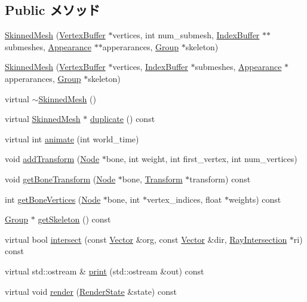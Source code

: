 \subsection*{Public メソッド}
\begin{CompactItemize}
\item 
\hyperlink{classm3g_1_1SkinnedMesh_277419d6851b0e305f66a46095269915}{SkinnedMesh} (\hyperlink{classm3g_1_1VertexBuffer}{VertexBuffer} $\ast$vertices, int num\_\-submesh, \hyperlink{classm3g_1_1IndexBuffer}{IndexBuffer} $\ast$$\ast$submeshes, \hyperlink{classm3g_1_1Appearance}{Appearance} $\ast$$\ast$apperarances, \hyperlink{classm3g_1_1Group}{Group} $\ast$skeleton)
\item 
\hyperlink{classm3g_1_1SkinnedMesh_094bf88089897beeb8b8776e3bbb299d}{SkinnedMesh} (\hyperlink{classm3g_1_1VertexBuffer}{VertexBuffer} $\ast$vertices, \hyperlink{classm3g_1_1IndexBuffer}{IndexBuffer} $\ast$submeshes, \hyperlink{classm3g_1_1Appearance}{Appearance} $\ast$apperarances, \hyperlink{classm3g_1_1Group}{Group} $\ast$skeleton)
\item 
virtual \hyperlink{classm3g_1_1SkinnedMesh_c73da5b5c5f8f14fc241328b4b78928c}{$\sim$SkinnedMesh} ()
\item 
virtual \hyperlink{classm3g_1_1SkinnedMesh}{SkinnedMesh} $\ast$ \hyperlink{classm3g_1_1SkinnedMesh_d3f422cf7656b73687d789094c7eae42}{duplicate} () const 
\item 
virtual int \hyperlink{classm3g_1_1SkinnedMesh_8aad1ceab4c2a03609c8a42324ce484d}{animate} (int world\_\-time)
\item 
void \hyperlink{classm3g_1_1SkinnedMesh_05077c4ee16f87ed4163f4d7a5f4f735}{addTransform} (\hyperlink{classm3g_1_1Node}{Node} $\ast$bone, int weight, int first\_\-vertex, int num\_\-vertices)
\item 
void \hyperlink{classm3g_1_1SkinnedMesh_e6c2fed8109053ded845e49f5c3b0c73}{getBoneTransform} (\hyperlink{classm3g_1_1Node}{Node} $\ast$bone, \hyperlink{classm3g_1_1Transform}{Transform} $\ast$transform) const 
\item 
int \hyperlink{classm3g_1_1SkinnedMesh_84ec0935b92b7ccc0aed7e66c4eac78f}{getBoneVertices} (\hyperlink{classm3g_1_1Node}{Node} $\ast$bone, int $\ast$vertex\_\-indices, float $\ast$weights) const 
\item 
\hyperlink{classm3g_1_1Group}{Group} $\ast$ \hyperlink{classm3g_1_1SkinnedMesh_ce7d69c2b600f6f01a46214db28e6f92}{getSkeleton} () const 
\item 
virtual bool \hyperlink{classm3g_1_1SkinnedMesh_dc812d8230f94f0b6b8e4fecdb802a16}{intersect} (const \hyperlink{classm3g_1_1Vector}{Vector} \&org, const \hyperlink{classm3g_1_1Vector}{Vector} \&dir, \hyperlink{classm3g_1_1RayIntersection}{RayIntersection} $\ast$ri) const 
\item 
virtual std::ostream \& \hyperlink{classm3g_1_1SkinnedMesh_6fea17fa1532df3794f8cb39cb4f911f}{print} (std::ostream \&out) const 
\item 
virtual void \hyperlink{classm3g_1_1SkinnedMesh_8babc8a79b78615da51161e94029eea9}{render} (\hyperlink{structm3g_1_1RenderState}{RenderState} \&state) const 
\end{CompactItemize}


